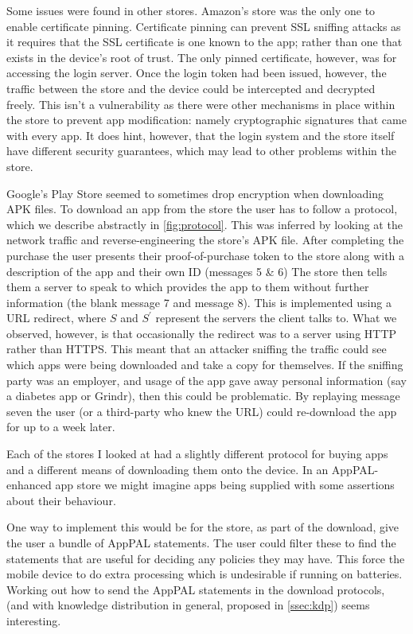 \documentclass[a4paper]{scrartcl}
\begin{document}
Some issues were found in other stores.
Amazon's store was the only one to enable certificate pinning.
Certificate pinning can prevent SSL sniffing attacks as it requires that the SSL certificate is one known to the app; rather than one that exists in the device's root of trust.
The only pinned certificate, however, was for accessing the login server.
Once the login token had been issued, however, the traffic between the store and the device could be intercepted and decrypted freely.
This isn't a vulnerability as there were other mechanisms in place within the store to prevent app modification: namely cryptographic signatures that came with every app.
It does hint, however, that the login system and the store itself have different security guarantees, which may lead to other problems within the store.

Google's Play Store seemed to sometimes drop encryption when downloading APK files.
To download an app from the store the user has to follow a protocol, which we describe abstractly in \autoref{fig:protocol}.
This was inferred by looking at the network traffic and reverse-engineering the store's APK file.
After completing the purchase the user presents their proof-of-purchase token to the store along with a description of the app and their own ID (messages 5 \& 6)
The store then tells them a server to speak to which provides the app to them without further information (the blank message 7 and message 8).
This is implemented using a URL redirect, where $S$ and $S^\prime$ represent the servers the client talks to.
What we observed, however, is that occasionally the redirect was to a server using HTTP rather than HTTPS.
This meant that an attacker sniffing the traffic could see which apps were being downloaded and take a copy for themselves.
If the sniffing party was an employer, and usage of the app gave away personal information (say a diabetes app or Grindr), then this could be problematic.
By replaying message seven the user (or a third-party who knew the URL) could re-download the app for up to a week later.

Each of the stores I looked at had a slightly different protocol for buying apps and a different means of downloading them onto the device.
In an AppPAL-enhanced app store we might imagine apps being supplied with some assertions about their behaviour.

One way to implement this would be for the store, as part of the download, give the user a bundle of AppPAL statements.
The user could filter these to find the statements that are useful for deciding any policies they may have.
This force the mobile device to do extra processing which is undesirable if running on batteries.
Working out how to send the AppPAL statements in the download protocols, (and with knowledge distribution in general, proposed in \autoref{ssec:kdp}) seems interesting.
\end{document}
